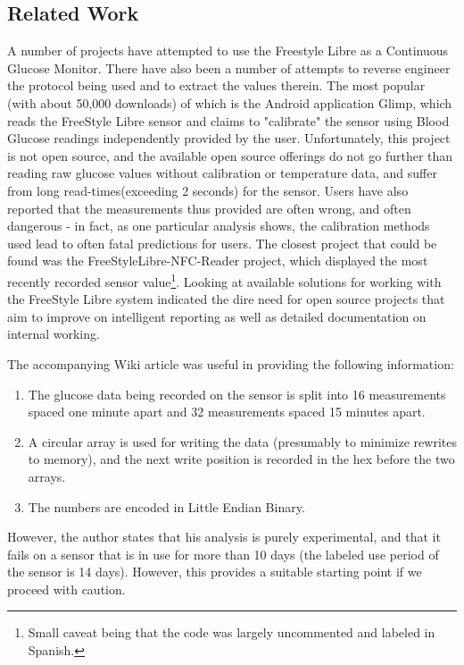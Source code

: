 \subsection{Related Work}

A number of projects have attempted to use the Freestyle Libre as a Continuous Glucose Monitor. There have also been a number of attempts to reverse engineer the protocol being used and to extract the values therein. The most popular (with about 50,000 downloads) of which is the Android application Glimp\cite{software_glimp_2017}, which reads the FreeStyle Libre sensor and claims to "calibrate" the sensor using Blood Glucose readings independently provided by the user. Unfortunately, this project is not open source, and the available open source offerings do not go further than reading raw glucose values without calibration or temperature data, and suffer from long read-times(exceeding 2 seconds) for the sensor. Users have also reported that the measurements thus provided are often wrong, and often dangerous - in fact, as one particular analysis shows, the calibration methods used lead to often fatal predictions for users\cite{v_libre_nodate}. The closest project that could be found was the FreeStyleLibre-NFC-Reader\cite{bautista_freestylelibre-nfc-reader:_2017} project, which displayed the most recently recorded sensor value\footnote{Small caveat being that the code was largely uncommented and labeled in Spanish.}. Looking at available solutions for working with the FreeStyle Libre system indicated the dire need for open source projects that aim to improve on intelligent reporting as well as detailed documentation on internal working.

The accompanying Wiki article was useful in providing the following information:

\begin{enumerate}
\item The glucose data being recorded on the sensor is split into 16 measurements spaced one minute apart and 32 measurements spaced 15 minutes apart.
\item A circular array is used for writing the data (presumably to minimize rewrites to memory), and the next write position is recorded in the hex before the two arrays.
\item The numbers are encoded in Little Endian Binary\cite{noauthor_endianness_2017}.
\end{enumerate}

However, the author states that his analysis is purely experimental, and that it fails on a sensor that is in use for more than 10 days (the labeled use period of the sensor is 14 days). However, this provides a suitable starting point if we proceed with caution.

